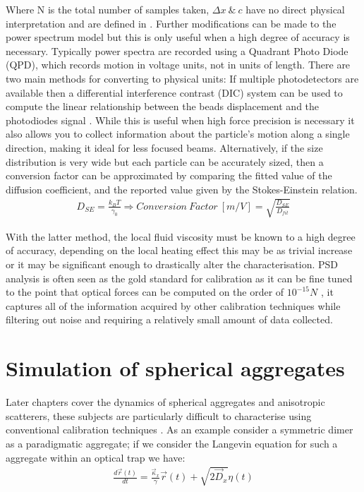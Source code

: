 Where N is the total number of samples taken, $\Delta x \ \& \ c$ 
have no direct physical interpretation and are defined in 
\cite{BergSoerensen2004}. Further modifications can be made to the 
power spectrum model but this is only useful when a high degree of 
accuracy is necessary. Typically power spectra are recorded using 
a Quadrant Photo Diode (QPD), which records motion in voltage units, 
not in units of length. There are two main methods for converting to
physical units: If multiple photodetectors are available then a 
differential interference contrast (DIC) system can be used to compute
the linear relationship between the beads displacement and the photodiodes
signal \cite{Capitanio2002}. While this is useful when high force precision 
is necessary it also allows you to collect information about the particle's 
motion along a single direction, making it ideal for less focused beams. 
Alternatively, if the size distribution is very wide but each particle can be 
accurately sized, then a conversion factor can be approximated by comparing 
the fitted value of the diffusion coefficient, and the reported value 
given by the Stokes-Einstein relation.
\begin{align}
	\label{eq:conversion_factor}
	D_{SE} = \frac{k_BT}{\gamma_0} \Rightarrow Conversion\ Factor \ [m/V]= \sqrt{\frac{D_{SE}}{D_{fit}}}
\end{align}

With the latter method, the local fluid viscosity must be known to a 
high degree of accuracy, depending on the local heating effect this 
may be as trivial increase or it may be significant enough to drastically 
alter the characterisation. PSD analysis is often seen as the gold 
standard for calibration as it can be fine tuned to the point that 
optical forces can be computed on the order of $10^{-15} N$ 
\cite{BergSoerensen2004}, it captures all of the information acquired 
by other calibration techniques while filtering out noise and requiring 
a relatively small amount of data collected. 

\section{Simulation of spherical aggregates}

Later chapters cover the dynamics of spherical aggregates and anisotropic 
scatterers, these subjects are particularly difficult to characterise 
using conventional calibration techniques \cite{Li2008, Yogesha2011PreciseCO}. 
As an example consider a symmetric dimer as a paradigmatic aggregate; 
if we consider the Langevin equation for such a aggregate within an optical 
trap we have:
\begin{align}
\frac{{d}\vec{r}(t)}{{dt}} = \frac{\vec{\kappa}_x}{\gamma}\vec{r}(t) + \sqrt{2\vec{D}_x}\eta(t)
\end{align}

